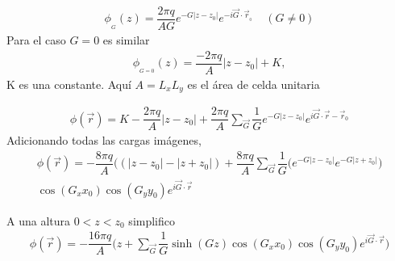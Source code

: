 \documentclass[a4paper,11pt,]{book}
\providecommand{\abs}[1]{\lvert#1\rvert}
\begin{document}
\begin{eqnarray}
\phi_{_{G}}(z)= \dfrac{2 \pi q}{AG}  e^{- G \abs{z-z_0}} e^{-i \vec{G} \cdot \vec{r}_{_0}} \ \ \ \ \ (G\neq 0)
\end{eqnarray}
Para el caso $G=0$ es similar 
\begin{eqnarray}
\phi_{_{G=0}}(z)= \dfrac{-2 \pi q}{A}  \abs{z-z_0} +K, 
\end{eqnarray}
K es una constante. Aquí $ A = L_x L_y $ es el área de celda unitaria

\begin{eqnarray}
\phi(\vec{r}) = K-\dfrac{2 \pi q}{A}  \abs{z-z_0} +\dfrac{2 \pi q}{A}\displaystyle\sum_{\vec{G}} \dfrac{1}{G} e^{- G \abs{z-z_0}}   e^{i \vec{G} \cdot \vec{r}-\vec{r}_0}
\end{eqnarray}
Adicionando todas las cargas  imágenes,
\begin{eqnarray}
\nonumber \phi(\vec{r}) = -\dfrac{8\pi q}{A} \bigg((\abs{z-z_0}-\abs{z+z_0} ) +\dfrac{8\pi q}{A}\displaystyle\sum_{\vec{G}} \dfrac{1}{G} \bigg( e^{- G \abs{z-z_0}} e^{- G \abs{z+z_0}}  \bigg) \\ \cos(G_x x_0) \cos(G_y y_0) e^{i \vec{G} \cdot \vec{r}} \ \ \ \
\end{eqnarray}

A una altura $ 0<z<z_0 $ simplifico
\begin{eqnarray}\label{Eq:EC11}
\phi(\vec{r}) = -\dfrac{16\pi q}{A} \bigg( z +\displaystyle\sum_{\vec{G}} \dfrac{1}{G} \sinh(G z)  \cos(G_x x_0) \cos(G_y y_0) e^{i \vec{G} \cdot \vec{r}} \bigg)
\end{eqnarray}
\end{document}
